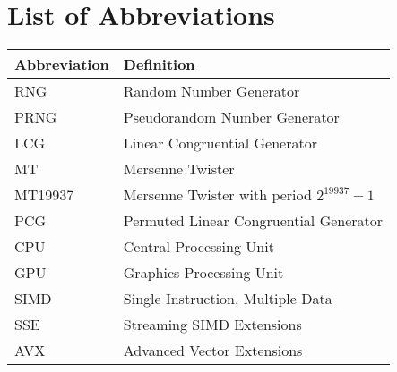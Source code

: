 \documentclass{stdlocal}
\begin{document}
  \section*{List of Abbreviations}

  \begin{table}[H]
    \center
    \renewcommand{\arraystretch}{1.3}
    \begin{tabularx}{\textwidth}{lX}
      \hline
      \textbf{Abbreviation} & \textbf{Definition} \\
      \hline
      \hline
      RNG & Random Number Generator \\
      PRNG & Pseudorandom Number Generator \\
      LCG & Linear Congruential Generator \\
      MT & Mersenne Twister \\
      MT19937 & Mersenne Twister with period $2^{19937}-1$ \\
      PCG & Permuted Linear Congruential Generator \\
      CPU & Central Processing Unit \\
      GPU & Graphics Processing Unit \\
      SIMD & Single Instruction, Multiple Data \\
      SSE & Streaming SIMD Extensions \\
      AVX & Advanced Vector Extensions \\
      \hline
    \end{tabularx}
  \end{table}
\end{document}

